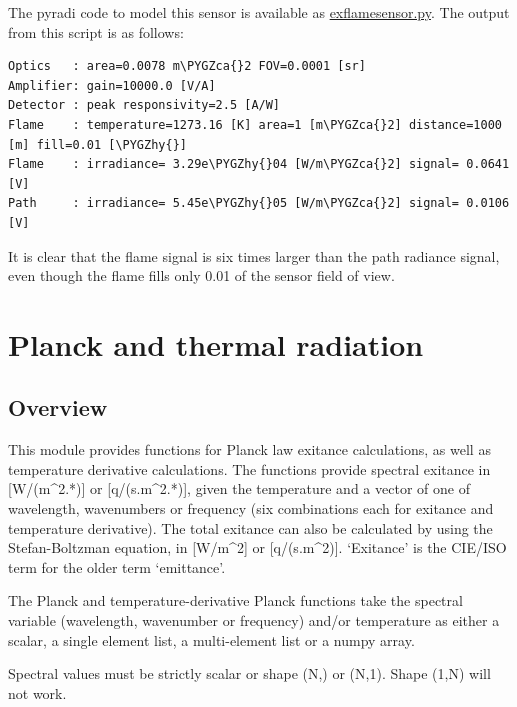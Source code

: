 \documentclass[a4paper,10pt,english]{sphinxmanual}
\def\PYGZca{\char`\^}
\def\PYGZhy{\char`\-}
\begin{document}
The pyradi code to model this sensor is available as \href{http://code.google.com/p/pyradi/source/browse/trunk/exflamesensor.py}{exflamesensor.py}.
The output from this script is as follows:

\begin{Verbatim}[commandchars=\\\{\}]
Optics   : area=0.0078 m\PYGZca{}2 FOV=0.0001 [sr]
Amplifier: gain=10000.0 [V/A]
Detector : peak responsivity=2.5 [A/W]
Flame    : temperature=1273.16 [K] area=1 [m\PYGZca{}2] distance=1000 [m] fill=0.01 [\PYGZhy{}]
Flame    : irradiance= 3.29e\PYGZhy{}04 [W/m\PYGZca{}2] signal= 0.0641 [V]
Path     : irradiance= 5.45e\PYGZhy{}05 [W/m\PYGZca{}2] signal= 0.0106 [V]
\end{Verbatim}

It is clear that the flame signal is six times larger than the path radiance
signal, even though the flame fills only 0.01 of the sensor field of view.


\chapter{Planck and thermal radiation}
\label{ryplanck:exflamesensor-py}\label{ryplanck:planck-and-thermal-radiation}\label{ryplanck::doc}

\section{Overview}
\label{ryplanck:overview}\label{ryplanck:module-pyradi.ryplanck}
This module provides functions for Planck law exitance calculations, as well as
temperature derivative calculations.
The functions provide spectral exitance in {[}W/(m\textasciicircum{}2.*){]} or {[}q/(s.m\textasciicircum{}2.*){]}, given
the temperature and a vector of one of wavelength, wavenumbers or frequency
(six combinations each for exitance and temperature derivative). The total
exitance can also be calculated by using the Stefan-Boltzman equation, in
{[}W/m\textasciicircum{}2{]} or {[}q/(s.m\textasciicircum{}2){]}.  `Exitance' is the CIE/ISO term for the older term `emittance'.

The Planck and temperature-derivative Planck functions take the spectral variable
(wavelength, wavenumber or frequency) and/or temperature as either a scalar, a 
single element list, a multi-element list or a numpy array.

Spectral values must be strictly scalar or shape (N,) or (N,1).  
Shape (1,N) will not work.
\end{document}
